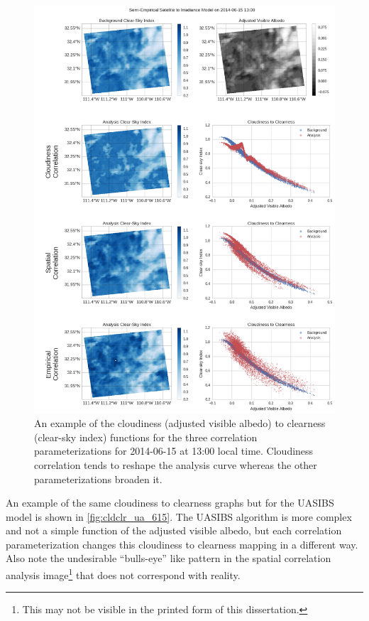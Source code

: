\begin{figure}[p]
\centering
\includegraphics[width=.9\textwidth]{figs/cld_to_clear_Semi-Empirical_2014-06-15.png}
\caption[Clearness versus Cloudiness for SE model on 6/15]{An example
  of the cloudiness (adjusted visible albedo) to clearness (clear-sky
  index) functions for the three correlation parameterizations for
  2014-06-15 at 13:00 local time. Cloudiness correlation tends to
  reshape the analysis curve whereas the other parameterizations broaden it.}
\label{fig:cldclr_se_615}
\end{figure}

An example of the same cloudiness to clearness graphs but for the
UASIBS model is shown in \cref{fig:cldclr_ua_615}.
The UASIBS algorithm is more complex and not a simple function
of the adjusted visible albedo, but each correlation parameterization
changes this cloudiness to clearness mapping in a different way.
Also note the undesirable ``bulls-eye'' like pattern in the spatial
correlation analysis image\footnote{This may not be visible in the
  printed form of this dissertation.} that does not correspond with
reality.


